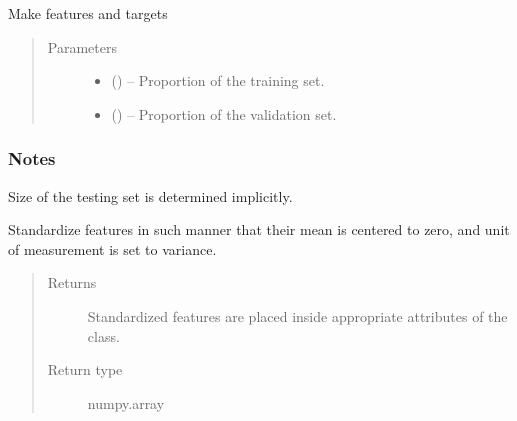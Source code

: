 \documentclass[a4paper,10pt,english]{sphinxmanual}
\begin{document}
\begin{fulllineitems}
\begin{fulllineitems}
\label{\detokenize{api/ucf.TrainingDataSets:ucf.TrainingDataSets.make_training_data}}
Make features and targets
\begin{quote}\begin{description}
\item[{Parameters}] \leavevmode\begin{itemize}
\item {} 
 () -- Proportion of the training set.

\item {} 
 () -- Proportion of the validation set.

\end{itemize}

\end{description}\end{quote}
\subsubsection*{Notes}

Size of the testing set is determined implicitly.

\end{fulllineitems}


\begin{fulllineitems}
\label{\detokenize{api/ucf.TrainingDataSets:ucf.TrainingDataSets.scale_features}}
Standardize features in such manner that their mean is centered
to zero, and unit of measurement is set to variance.
\begin{quote}\begin{description}
\item[{Returns}] \leavevmode
Standardized features are placed inside appropriate
attributes of the class.

\item[{Return type}] \leavevmode
numpy.array

\end{description}\end{quote}


\end{fulllineitems}
\end{fulllineitems}
\end{document}

